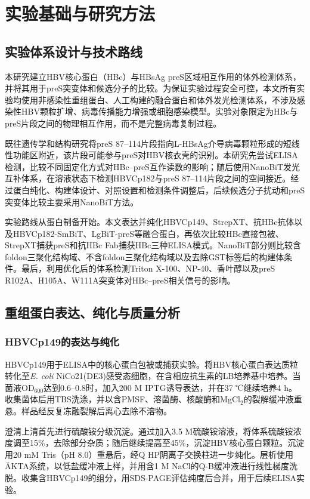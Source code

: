 \chapter{实验基础与研究方法}

\section{实验体系设计与技术路线}

本研究建立HBV核心蛋白（HBc）与HBsAg preS区域相互作用的体外检测体系，并将其用于preS突变体和候选分子的比较。为保证实验过程安全可控，本文所有实验均使用非感染性重组蛋白、人工构建的融合蛋白和体外发光检测体系，不涉及感染性HBV颗粒扩增、病毒传播能力增强或细胞感染模型。实验对象限定为HBc与preS片段之间的物理相互作用，而不是完整病毒复制过程。

既往遗传学和结构研究将preS 87--114片段指向L-HBsAg介导病毒颗粒形成的短线性功能区附近，该片段可能参与preS对HBV核衣壳的识别。本研究先尝试ELISA检测，比较不同固定化方式对HBc--preS互作读数的影响；随后使用NanoBiT发光互补体系，在溶液状态下检测HBVCp182与preS 87--114片段之间的空间接近。经过蛋白纯化、构建体设计、对照设置和检测条件调整后，后续候选分子扰动和preS突变体比较主要采用NanoBiT方法。

实验路线从蛋白制备开始。本文表达并纯化HBVCp149、StrepXT、抗HBc抗体以及HBVCp182-SmBiT、LgBiT-preS等融合蛋白，再依次比较HBc直接包被、StrepXT捕获preS和抗HBc Fab捕获HBc三种ELISA模式。NanoBiT部分则比较含foldon三聚化结构域、不含foldon三聚化结构域以及去除GST标签后的构建体条件。最后，利用优化后的体系检测Triton X-100、NP-40、香叶醇以及preS R102A、H105A、W111A突变体对HBc--preS相关信号的影响。

\section{重组蛋白表达、纯化与质量分析}

\subsection{HBVCp149的表达与纯化}

HBVCp149用于ELISA中的核心蛋白包被或捕获实验。将HBV核心蛋白表达质粒转化至\textit{E. coli} NiCo21(DE3)感受态细胞，在含相应抗生素的LB培养基中培养。当菌液OD$_{600}$达到0.6--0.8时，加入200 \textmu M IPTG诱导表达，并在37 ℃继续培养4 h。收集菌体后用TBS洗涤，并以含PMSF、溶菌酶、核酸酶和MgCl$_2$的裂解缓冲液重悬。样品经反复冻融裂解后离心去除不溶物。

澄清上清首先进行硫酸铵分级沉淀。通过加入3.5 M硫酸铵溶液，将体系硫酸铵浓度调至15\%，去除部分杂质；随后继续提高至45\%，沉淀HBV核心蛋白颗粒。沉淀用20 mM Tris（pH 8.0）重悬后，经Q HP阴离子交换柱进一步纯化。层析使用ÄKTA系统，以低盐缓冲液上样，并用含1 M NaCl的Q-B缓冲液进行线性梯度洗脱。收集含HBVCp149的组分，用SDS-PAGE评估纯度后合并，用于后续ELISA实验。

